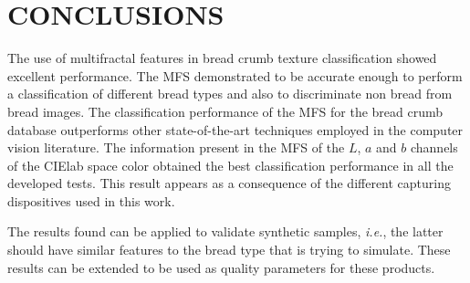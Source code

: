 \documentclass[a4paper,10pt]{article}
\begin{document}
\section{CONCLUSIONS}
The use of multifractal features in bread crumb texture classification showed excellent performance. The MFS demonstrated to be accurate enough to perform a classification of different bread types and also to discriminate non bread from bread images. The classification performance of the MFS for the bread crumb database outperforms other state-of-the-art techniques employed in the computer vision literature. The information present in the MFS of the $L$, $a$ and $b$ channels of the CIElab space color obtained the best classification performance in all the developed tests. This result appears as a consequence of the different capturing dispositives used in this work.

The results found can be applied to validate synthetic samples, {\em i.e.}, the latter should have similar features to the bread type that is trying to simulate. These results can be extended to be used as quality parameters for these products.




\end{document}
